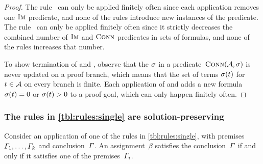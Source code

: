 \begin{proof}
  The rule~\Expand{} can only be applied finitely often since each
  application removes one $\operatorname{\textsc{Im}}$ predicate, and none of the rules
  introduce new instances of the predicate. The rule~\Subsume{} can
  only be applied finitely often since it strictly decreases the
  combined number of $\operatorname{\textsc{Im}}$ and $\operatorname{\textsc{Conn}}$ predicates in sets of
  formulas, and none of the rules increases that number.

  To show termination of \Split{} and \Propagate{}, observe that the
  $\operatorname{\sigma}$ in a predicate~$\operatorname{\textsc{Conn}}(\mathcal{A}, \operatorname{\sigma})$ is never
  updated on a proof branch, which means that the set of terms
  $\operatorname{\sigma}(t)$ for $t \in \mathcal{A}$ on every branch is finite. Each
  application of \Split{} and \Propagate{} adds a new
  formula~$\operatorname{\sigma}(t) = 0$ or $\operatorname{\sigma}(t) > 0$
  to a proof goal, which can only happen finitely often.
\end{proof}

\subsubsection{The rules in \cref{tbl:rules:single} are solution-preserving}

\begin{lemma}\label{lma:single-correct}
  Consider an application of one of the rules in
  \cref{tbl:rules:single}, with
  premises~$\varGamma_1, \ldots, \varGamma_k$ and
  conclusion~$\varGamma$. An assignment~$\beta$ satisfies the
  conclusion~$\varGamma$ if and only if it satisfies one of the
  premises~$\varGamma_i$.
\end{lemma}

